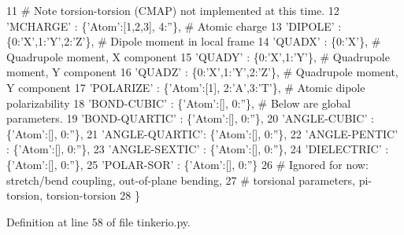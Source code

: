 \begin{DoxyCode}
11          \textcolor{comment}{# Note torsion-torsion (CMAP) not implemented at this time.}
12          \textcolor{stringliteral}{'MCHARGE'}      : \{\textcolor{stringliteral}{'Atom'}:[1,2,3], 4:\textcolor{stringliteral}{''}\},          \textcolor{comment}{# Atomic charge}
13          \textcolor{stringliteral}{'DIPOLE'}       : \{0:\textcolor{stringliteral}{'X'},1:\textcolor{stringliteral}{'Y'},2:\textcolor{stringliteral}{'Z'}\},             \textcolor{comment}{# Dipole moment in local frame}
14          \textcolor{stringliteral}{'QUADX'}        : \{0:\textcolor{stringliteral}{'X'}\},                         \textcolor{comment}{# Quadrupole moment, X component}
15          \textcolor{stringliteral}{'QUADY'}        : \{0:\textcolor{stringliteral}{'X'},1:\textcolor{stringliteral}{'Y'}\},                   \textcolor{comment}{# Quadrupole moment, Y component}
16          \textcolor{stringliteral}{'QUADZ'}        : \{0:\textcolor{stringliteral}{'X'},1:\textcolor{stringliteral}{'Y'},2:\textcolor{stringliteral}{'Z'}\},             \textcolor{comment}{# Quadrupole moment, Y component}
17          \textcolor{stringliteral}{'POLARIZE'}     : \{\textcolor{stringliteral}{'Atom'}:[1], 2:\textcolor{stringliteral}{'A'},3:\textcolor{stringliteral}{'T'}\},       \textcolor{comment}{# Atomic dipole polarizability}
18          \textcolor{stringliteral}{'BOND-CUBIC'}   : \{\textcolor{stringliteral}{'Atom'}:[], 0:\textcolor{stringliteral}{''}\},    \textcolor{comment}{# Below are global parameters.}
19          \textcolor{stringliteral}{'BOND-QUARTIC'} : \{\textcolor{stringliteral}{'Atom'}:[], 0:\textcolor{stringliteral}{''}\},
20          \textcolor{stringliteral}{'ANGLE-CUBIC'}  : \{\textcolor{stringliteral}{'Atom'}:[], 0:\textcolor{stringliteral}{''}\},
21          \textcolor{stringliteral}{'ANGLE-QUARTIC'}: \{\textcolor{stringliteral}{'Atom'}:[], 0:\textcolor{stringliteral}{''}\},
22          \textcolor{stringliteral}{'ANGLE-PENTIC'} : \{\textcolor{stringliteral}{'Atom'}:[], 0:\textcolor{stringliteral}{''}\},
23          \textcolor{stringliteral}{'ANGLE-SEXTIC'} : \{\textcolor{stringliteral}{'Atom'}:[], 0:\textcolor{stringliteral}{''}\},
24          \textcolor{stringliteral}{'DIELECTRIC'}   : \{\textcolor{stringliteral}{'Atom'}:[], 0:\textcolor{stringliteral}{''}\},
25          \textcolor{stringliteral}{'POLAR-SOR'}    : \{\textcolor{stringliteral}{'Atom'}:[], 0:\textcolor{stringliteral}{''}\}
26                                                 \textcolor{comment}{# Ignored for now: stretch/bend coupling, out-of-plane
       bending,}
27                                                 \textcolor{comment}{# torsional parameters, pi-torsion, torsion-torsion}
28          \}
\end{DoxyCode}


Definition at line 58 of file tinkerio.\+py.

